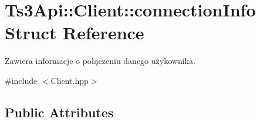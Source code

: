 \hypertarget{struct_ts3_api_1_1_client_1_1connection_info}{}\section{Ts3\+Api\+:\+:Client\+:\+:connection\+Info Struct Reference}
\label{struct_ts3_api_1_1_client_1_1connection_info}


Zawiera informacje o połączeniu danego użykownika.  




{\ttfamily \#include $<$Client.\+hpp$>$}

\subsection*{Public Attributes}
